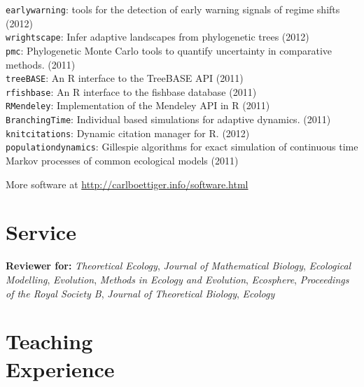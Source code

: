 \documentclass[margin]{res}
\begin{document}
\begin{resume}
\texttt{earlywarning}: tools for the detection of early warning signals of regime shifts (2012)\\
\texttt{wrightscape}: Infer adaptive landscapes from phylogenetic trees (2012) \\
\texttt{pmc}: Phylogenetic Monte Carlo tools to quantify uncertainty in comparative methods. (2011)\\
\texttt{treeBASE}: An R interface to the TreeBASE API (2011) \\
\texttt{rfishbase}: An R interface to the fishbase database (2011) \\
\texttt{RMendeley}: Implementation of the Mendeley API in R (2011) \\
\texttt{BranchingTime}: Individual based simulations for adaptive dynamics. (2011) \\
\texttt{knitcitations}: Dynamic citation manager for R. (2012) \\
\texttt{populationdynamics}: Gillespie algorithms for exact simulation of continuous time Markov processes of common ecological models (2011) 

More software at \href{http://carlboettiger.info/software.html}{http://carlboettiger.info/software.html}

\section{Service}

\textbf{Reviewer for:}   \emph{Theoretical Ecology}, \emph{Journal of Mathematical Biology}, \emph{Ecological Modelling},
\emph{Evolution}, \emph{Methods in Ecology and Evolution}, \emph{Ecosphere}, \emph{Proceedings of the Royal Society B}, \emph{Journal of Theoretical Biology}, \emph{Ecology} 


\section{Teaching\\Experience}
\begin{format}
\\
\end{format}

\begin{position}
\end{position}

\begin{position}
\end{position}



\end{resume}
\end{document}
